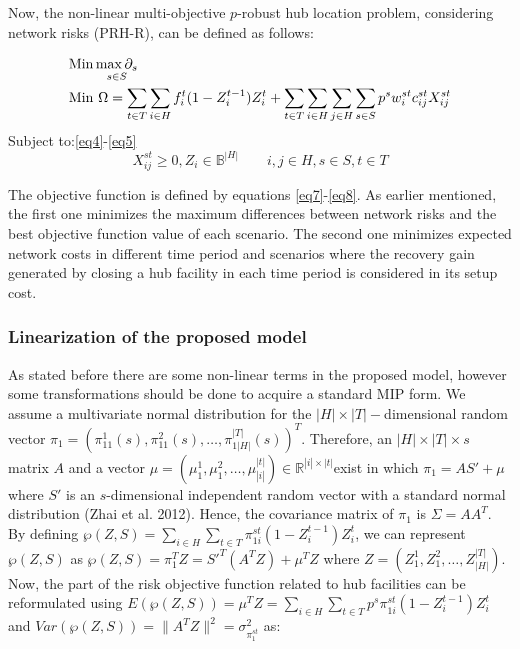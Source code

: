 \documentclass[review]{elsarticle}
\begin{document}
Now, the non-linear multi-objective $p$-robust hub location problem, considering network risks (PRH-R), can be defined as follows:

\begin{align}
&{\rm Min}\mathop{\max\partial_s}_{s\in S}\label{eq7}\\
&{\rm Min}~\Omega =\sum_{t\in T}\sum_{i\in H}f^t_i(1-Z^{t-1}_i)Z^t_i+\sum_{t\in T}\sum_{i\in H}\sum_{j\in H}\sum_{s\in S}p^sw^{st}_i c^{st}_{ij} X^{st}_{ij}\label{eq8}
\end{align}
Subject to:\eqref{eq4}-\eqref{eq5}
\[
X^{s t}_{ij}\geq 0, Z_i\in \mathbb{B}^{|H|} \qquad i, j\in H, s\in S, t\in T\nonumber
\]

The objective function is defined by equations \eqref{eq7}-\eqref{eq8}. As earlier mentioned, the first one minimizes the maximum differences between network risks and the best objective function value of each scenario. The second one minimizes expected network costs in different time period and scenarios where the recovery gain generated by closing a hub facility in each time period is considered in its setup cost. 

\subsubsection{Linearization of the proposed model}
As stated before there are some non-linear terms in the proposed model, however some transformations should be done to acquire a standard MIP form. We assume a multivariate normal distribution for the $|H|\times |T|-$dimensional random vector $\pi_{1} =\left(\pi_{11}^{1}(s),\pi_{11}^{2} (s),\ldots,\pi_{1|H|}^{|T|} (s)\right)^{T} .$ Therefore, an $|H|\times |T|\times s$ matrix $A$ and a vector $\mu =\left(\mu_{1}^{1} ,\mu_{1}^{2} ,\ldots,\mu_{|i|}^{|t|} \right)\in \mathbb{ R}^{|i|\times |t|} $exist in which $\pi_{1} =AS'+\mu $ where $S'$ is an $s$-dimensional independent random vector with a standard normal distribution (Zhai et al. 2012). Hence, the covariance matrix of $\pi_{1} $ is $\Sigma =AA^{T} $. By defining $\wp (Z,S)=\sum _{i\in H}\sum _{t\in T}\pi _{1i}^{st} \left(1-Z_{i}^{t-1} \right)  Z_{i}^{t} $, we can represent $\wp (Z,S)$ as $\wp (Z,S)=\pi _{1}^{T} Z=S'^{T} \left(A^{T} Z\right)+\mu ^{T} Z$ where $Z=\left(Z_{1}^{1}, Z_{1}^{2}, \ldots, Z_{|H|}^{|T|} \right).$ Now, the part of the risk objective function related to hub facilities can be reformulated using $E \left(\wp (Z,S)\right)=\mu^{T} Z=\sum _{i\in H}\sum _{t\in T}p^{s} \pi _{1i}^{st} \left(1-Z_{i}^{t-1} \right)  Z_{i}^{t} $ and ${ Var}\left(\wp (Z,S)\right)=\|A^{T} Z\|^{2} =\sigma _{{\pi}_{1}^{st} }^{2} $ as:
\end{document}
